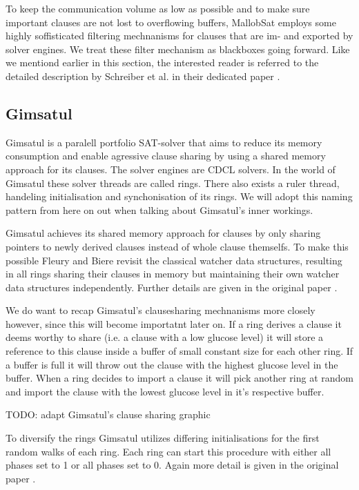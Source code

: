 \documentclass[12pt,a4paper,twoside]{scrartcl}
\numberwithin{equation}{section}
\begin{document}
To keep the communication volume as low as possible and to make sure important clauses are not lost to overflowing buffers, MallobSat employs some highly soffisticated filtering mechnanisms for clauses that are im- and exported by solver engines. We treat these filter mechanism as blackboxes going forward. Like we mentiond earlier in this section, the interested reader is referred to the detailed description by Schreiber et al. in their dedicated paper \cite{mallobSat}.

\subsection{Gimsatul}

Gimsatul \cite{gimsatul} is a paralell portfolio SAT-solver that aims to reduce its memory consumption and enable agressive clause sharing by using a shared memory approach for its clauses. The solver engines are CDCL solvers. In the world of Gimsatul these solver threads are called rings. There also exists a ruler thread, handeling initialisation and synchonisation of its rings. We will adopt this naming pattern from here on out when talking about Gimsatul's inner workings.

Gimsatul achieves its shared memory approach for clauses by only sharing pointers to newly derived clauses instead of whole clause themselfs. To make this possible Fleury and Biere revisit the classical watcher data structures, resulting in all rings sharing their clauses in memory but maintaining their own watcher data structures independently. Further details are given in the original paper \cite{gimsatul}.

We do want to recap Gimsatul's clausesharing mechnanisms more closely however, since this will become importatnt later on. If a ring derives a clause it deems worthy to share (i.e. a clause with a low glucose level) it will store a reference to this clause inside a buffer of small constant size for each other ring. If a buffer is full it will throw out the clause with the highest glucose level in the buffer. When a ring decides to import a clause it will pick another ring at random and import the clause with the lowest glucose level in it's respective buffer.

TODO: adapt Gimsatul's clause sharing graphic

To diversify the rings Gimsatul utilizes differing initialisations for the first random walks of each ring. Each ring can start this procedure with either all phases set to 1 or all phases set to 0. Again more detail is given in the original paper \cite{gimsatul}.
\end{document}
